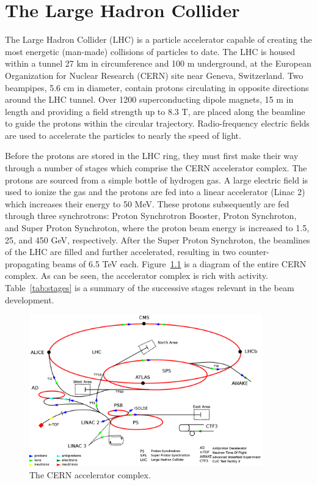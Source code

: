 \chapter{The Large Hadron Collider}
\label{chap:lhc}

The Large Hadron Collider (LHC) is a particle accelerator capable of creating the most energetic (man-made) collisions of particles to date. The LHC is housed within a tunnel 27 km in circumference and 100 m underground, at the European Organization for Nuclear Research (CERN) site near Geneva, Switzerland. Two beampipes, 5.6 cm in diameter, contain protons circulating in opposite directions around the LHC tunnel. Over 1200 superconducting dipole magnets, 15 m in length and providing a field strength up to 8.3 T, are placed along the beamline to guide the protons within the circular trajectory. Radio-frequency electric fields are used to accelerate the particles to nearly the speed of light.

Before the protons are stored in the LHC ring, they must first make their way through a number of stages which comprise the CERN accelerator complex. The protons are sourced from a simple bottle of hydrogen gas. A large electric field is used to ionize the gas and the protons are fed into a linear accelerator (Linac 2) which increases their energy to 50 MeV. These protons subsequently are fed through three synchrotrons: Proton Synchrotron Booster, Proton Synchroton, and Super Proton Synchroton, where the proton beam energy is increased to 1.5, 25, and 450 GeV, respectively. After the Super Proton Synchroton, the beamlines of the LHC are filled and further accelerated, resulting in two counter-propagating beams of 6.5 TeV each. Figure~\ref{fig:lhc} is a diagram of the entire CERN complex. As can be seen, the accelerator complex is rich with activity. Table~\ref{tab:stages} is a summary of the successive stages relevant in the beam development.

\begin{figure}
\centering
\includegraphics[width=0.9\textwidth]{figs/lhcschematic.png}
\caption[The CERN accelerator complex.]{The CERN accelerator complex. \cite{wiki:lhc}}
\label{fig:lhc}
\end{figure}

